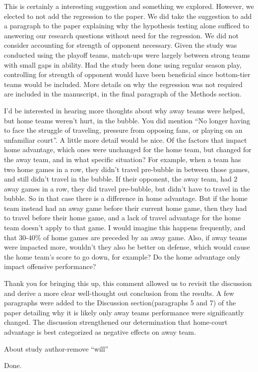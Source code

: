 \documentclass[12pt]{article}
\newenvironment{comment}%
{\begin{quoting}\noindent\small\it\ignorespaces%
  }{\end{quoting}}
\begin{document}
 This is certainly a interesting suggestion and something we explored. However, we 
 elected to not add the regression to the paper. We did take the suggestion to add
 a paragraph to the paper explaining why the hypothesis testing alone sufficed to
 answering our research questions without need for the regression. We did not
 consider accounting for strength of opponent necessary. Given the study was 
 conducted using the playoff teams, match-ups were largely between strong teams 
 with small gaps in ability. Had the study been done using regular season play, 
 controlling for strength of opponent would have been beneficial since bottom-tier 
 teams would be included. More details on why the regression was not required are 
 included in the manuscript, in the final paragraph of the Methods section.

\begin{comment}
I’d be interested in hearing more thoughts about why away teams were helped,
but home teams weren’t hurt, in the bubble. You did mention “No longer having
to face the struggle of traveling, pressure from opposing fans, or playing on
an unfamiliar court”. A little more detail would be nice. Of the factors that
impact home advantage, which ones were unchanged for the home team, but
changed for the away team, and in what specific situation?
For example, when a team has two home games in a row, they didn’t travel 
pre-bubble in between those games, and still didn’t travel in the bubble. If 
their opponent, the away team, had 2 away games in a row, they did travel pre-bubble,
but didn’t have to travel in the bubble. So in that case there is a difference in home advantage.
But if the home team instead had an away game before their current home game,
then they had to travel before their home game, and a lack of travel advantage
for the home team doesn’t apply to that game. I would imagine this happens 
frequently, and that 30-40\% of home games are preceded by an away game.
Also, if away teams were impacted more, wouldn’t they also be better on 
defense, which would cause the home team’s score to go down, for example?
Do the home advantage only impact offensive performance?
\end{comment}

 Thank you for bringing this up, this comment allowed us to revisit the discussion 
 and derive a more clear well-thought out conclusion from the results. A few 
 paragraphs were added to the Discussion section(paragraphs 5 and 7) of the paper detailing why
 it is likely only away teams performance were significantly changed. The 
 discussion strengthened our determination that home-court advantage is best 
 categorized as negative effects on away team.

\begin{comment}
About study author-remove “will”
\end{comment}

Done.




\end{document}
